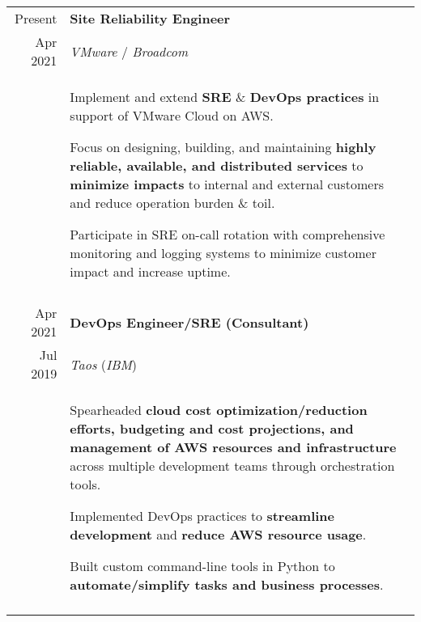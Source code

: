 \documentclass[10pt]{article}
\newcommand{\afterlistspace}[0]{\vspace{-1.5em}}
\begin{document}
\begin{tabular}{r|p{16cm}}

    Present & \textbf{Site Reliability Engineer}
    \\
    Apr 2021 & \emph{VMware} / \emph{Broadcom}
    \\
    & \begin{itemize}
        \footnotesize{
            \item Implement and extend \textbf{SRE} \& \textbf{DevOps practices} in support of VMware Cloud on AWS.

            \item Focus on designing, building, and maintaining \textbf{highly reliable, available, and distributed services} to \textbf{minimize impacts} to internal and external customers and reduce operation burden \& toil.

            \item Participate in SRE on-call rotation with comprehensive monitoring and logging systems to minimize customer impact and increase uptime.
        }

        \afterlistspace
    \end{itemize}
    
    \\
    \multicolumn{2}{c}{}
    \\

    Apr 2021 & \textbf{DevOps Engineer/SRE (Consultant)}
    \\
    Jul 2019 & \emph{Taos} (\emph{IBM})
    \\
    & \begin{itemize}
        \footnotesize{
            \item Spearheaded \textbf{cloud cost optimization/reduction efforts, budgeting and cost projections, and management of AWS resources and infrastructure} across multiple development teams through orchestration tools.
            
            \item Implemented DevOps practices to \textbf{streamline development} and \textbf{reduce AWS resource usage}.
            
            \item Built custom command-line tools in Python to \textbf{automate/simplify tasks and business processes}.
        }

        \afterlistspace
    \end{itemize}
    
    \\
    \multicolumn{2}{c}{}
    \\


\end{tabular}
\end{document}
